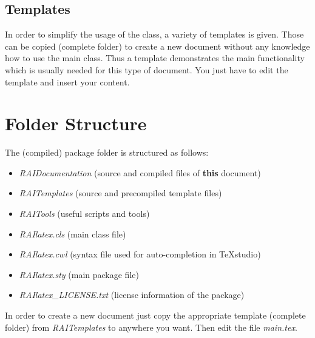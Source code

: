 \subsection{Templates}%
\label{sec:frontmatter_templates}%
In order to simplify the usage of the class, a variety of templates is given. Those can be copied (complete folder) to create a new document without any knowledge how to use the main class. Thus a template demonstrates the main functionality which is usually needed for this type of document. You just have to edit the template and insert your content.\par%
%
%
\section{Folder Structure}%
The (compiled) package folder is structured as follows:\par%
%
\begin{itemize}\itemsep0pt%
    \item \textit{RAIDocumentation} (source and compiled files of \textbf{this} document)
    \item \textit{RAITemplates} (source and precompiled template files)
    \item \textit{RAITools} (useful scripts and tools)
    \item \textit{RAIlatex.cls} (main class file)
    \item \textit{RAIlatex.cwl} (syntax file used for auto-completion in TeXstudio)
    \item \textit{RAIlatex.sty} (main package file)
    \item \textit{RAIlatex\_LICENSE.txt} (license information of the package)
\end{itemize}%
%
In order to create a new document just copy the appropriate template (complete folder) from \textit{RAITemplates} to anywhere you want. Then edit the file \textit{main.tex}.\par%
%
%
